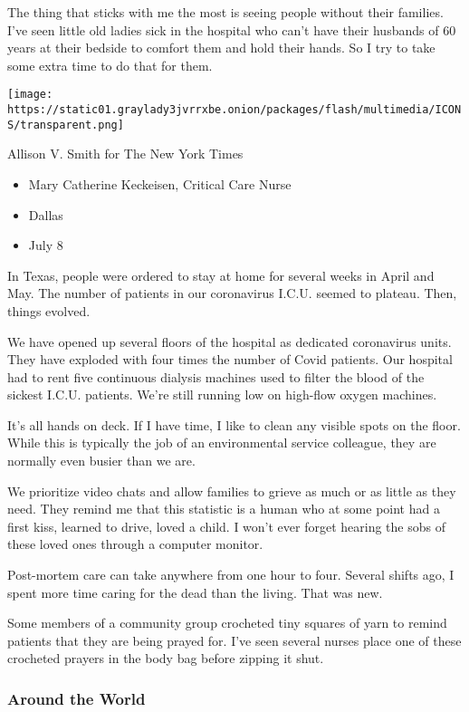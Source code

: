 The thing that sticks with me the most is seeing people without their
families. I've seen little old ladies sick in the hospital who can't
have their husbands of 60 years at their bedside to comfort them and
hold their hands. So I try to take some extra time to do that for them.

\texttt{[image: https://static01.graylady3jvrrxbe.onion/packages/flash/multimedia/ICONS/transparent.png]}

Allison V. Smith for The New York Times

\begin{itemize}
\tightlist
\item
  Mary Catherine Keckeisen, Critical Care Nurse
\item
  Dallas
\item
  July 8
\end{itemize}

In Texas, people were ordered to stay at home for several weeks in April
and May. The number of patients in our coronavirus I.C.U. seemed to
plateau. Then, things evolved.

We have opened up several floors of the hospital as dedicated
coronavirus units. They have exploded with four times the number of
Covid patients. Our hospital had to rent five continuous dialysis
machines used to filter the blood of the sickest I.C.U. patients. We're
still running low on high-flow oxygen machines.

It's all hands on deck. If I have time, I like to clean any visible
spots on the floor. While this is typically the job of an environmental
service colleague, they are normally even busier than we are.

We prioritize video chats and allow families to grieve as much or as
little as they need. They remind me that this statistic is a human who
at some point had a first kiss, learned to drive, loved a child. I won't
ever forget hearing the sobs of these loved ones through a computer
monitor.

Post-mortem care can take anywhere from one hour to four. Several shifts
ago, I spent more time caring for the dead than the living. That was
new.

Some members of a community group crocheted tiny squares of yarn to
remind patients that they are being prayed for. I've seen several nurses
place one of these crocheted prayers in the body bag before zipping it
shut.

\hypertarget{around-the-world-1}{%
\subsubsection{Around the World}\label{around-the-world-1}}

